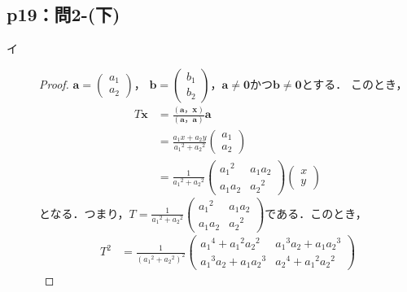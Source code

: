 \documentclass[uplatex,dvipdfmx,a4paper,10pt,fleqn]{jsarticle}
\begin{document}
\subsection*{p19：問2-(下)}
\begin{tleftbar}
\begin{description}
    \item[イ] 
    \begin{proof}
    $\bm{a}=
        \begin{pmatrix}
            a_1 \\
            a_2
        \end{pmatrix}
    $，
    $\bm{b}=
        \begin{pmatrix}
            b_1 \\
            b_2
        \end{pmatrix}
    $，$\bm{a} \ne \bm{0}$かつ$\bm{b} \ne \bm{0}$とする．
    このとき，
    \begin{align*}
        T \bm{x} &=\frac{(\bm{a}，\bm{x})}{(\bm{a}，\bm{a})} \bm{a} \\
        & = \frac{a_1 x + a_2 y}{{a_1}^2+{a_2}^2} 
        \begin{pmatrix}
            a_1 \\
            a_2
        \end{pmatrix}
        \\
        & =
        \frac{1}{{a_1}^2+{a_2}^2}
        \begin{pmatrix}
            {a_1}^2 & a_1 a_2 \\
            a_1 a_2 & {a_2}^2
        \end{pmatrix}
        \begin{pmatrix}
            x \\
            y
        \end{pmatrix}
    \end{align*}
    となる．つまり，$T=\frac{1}{{a_1}^2+{a_2}^2}
    \begin{pmatrix}
        {a_1}^2 & a_1 a_2 \\
        a_1 a_2 & {a_2}^2
    \end{pmatrix}
    $である．このとき，
    \begin{align*}
        T^2 &= \frac{1}{({a_1}^2+{a_2}^2)^2}
        \begin{pmatrix}
            {a_1}^4 + {a_1}^2 {a_2}^2 & {a_1}^3 a_2 + a_1 {a_2}^3 \\
            {a_1}^3 a_2 + a_1 {a_2}^3 & {a_2}^4 + {a_1}^2 {a_2}^2

\end{pmatrix}
\end{align*}
\end{proof}
\end{description}
\end{tleftbar}
\end{document}
